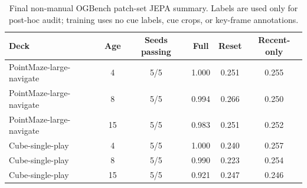 \begin{table}[H]
\centering
\footnotesize
\caption{Final non-manual OGBench patch-set JEPA summary.  Labels are used
only for post-hoc audit; training uses no cue labels, cue crops, or key-frame
annotations.}
\begin{tabular}{lccccc}
\toprule
Deck & Age & Seeds passing & Full & Reset & Recent-only\\
\midrule
PointMaze-large-navigate & 4  & 5/5 & 1.000 & 0.251 & 0.255\\
PointMaze-large-navigate & 8  & 5/5 & 0.994 & 0.266 & 0.250\\
PointMaze-large-navigate & 15 & 5/5 & 0.983 & 0.251 & 0.252\\
Cube-single-play         & 4  & 5/5 & 1.000 & 0.240 & 0.257\\
Cube-single-play         & 8  & 5/5 & 0.990 & 0.223 & 0.254\\
Cube-single-play         & 15 & 5/5 & 0.921 & 0.247 & 0.246\\
\bottomrule
\end{tabular}
\end{table}
